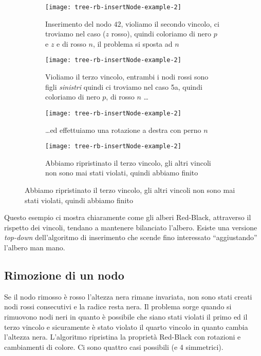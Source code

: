 \begin{figure}[H]\centering
	\begin{subfigure}[t]{.48\linewidth}\centering
		\texttt{[image: tree-rb-insertNode-example-2]}
		\caption{Inserimento del nodo \(42\), violiamo il secondo vincolo, ci troviamo nel caso {\footnotesize{}} (\(z\) rosso), quindi coloriamo di nero \(p\) e \(z\) e di rosso \(n\), il problema si sposta ad \(n\)}
	\end{subfigure}
	\hfill
	\begin{subfigure}[t]{.48\linewidth}\centering
		\texttt{[image: tree-rb-insertNode-example-2]}
		\caption{Violiamo il terzo vincolo, entrambi i nodi rossi sono figli \emph{sinistri} quindi ci troviamo nel caso {\footnotesize\ttfamily 5a}, quindi coloriamo di nero \(p\), di rosso \(n\) \dots}
	\end{subfigure}

	\vspace{5pt}

	\begin{subfigure}[t]{.48\linewidth}\centering
		\texttt{[image: tree-rb-insertNode-example-2]}
		\caption{\dots ed effettuiamo una rotazione a destra con perno \(n\)}
	\end{subfigure}
	\hfill
	\begin{subfigure}[b]{.48\linewidth}\centering
		\texttt{[image: tree-rb-insertNode-example-2]}
		\caption{Abbiamo ripristinato il terzo vincolo, gli altri vincoli non sono mai stati violati, quindi abbiamo finito}
	\end{subfigure}
\end{figure}
\vspace{-10pt}

Questo esempio ci mostra chiaramente come gli alberi Red-Black, attraverso il rispetto dei vincoli, tendano a mantenere bilanciato l'albero.
Esiste una versione \emph{top-down} dell'algoritmo di inserimento che scende fino interessato \enquote{aggiustando} l'albero man mano.

\clearpage
\subsection{Rimozione di un nodo}

Se il nodo rimosso è rosso l'altezza nera rimane invariata, non sono stati creati nodi rossi consecutivi e la radice resta nera.
Il problema sorge quando si rimuovono nodi neri in quanto è possibile che siano stati violati il primo ed il terzo vincolo e sicuramente è stato violato il quarto vincolo in quanto cambia l'altezza nera.
L'algoritmo  ripristina la proprietà Red-Black con rotazioni e cambiamenti di colore.
Ci sono quattro casi possibili (e 4 simmetrici).

